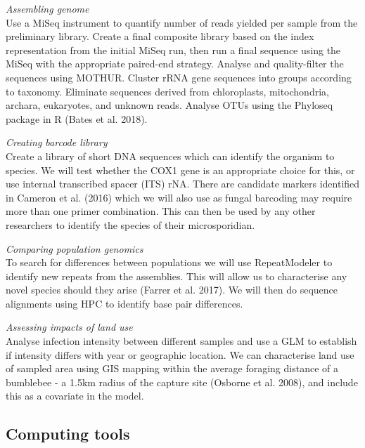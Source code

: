 \documentclass[11pt]{article}
\begin{document}
		\item \textit{Assembling genome} \\
		
		Use a MiSeq instrument to quantify number of reads yielded per sample from the preliminary library. Create a final composite library based on the index representation from the initial MiSeq run, then run a final sequence using the MiSeq with the appropriate paired-end strategy. Analyse and quality-filter the sequences using MOTHUR. Cluster rRNA gene sequences into groups according to taxonomy. Eliminate sequences derived from chloroplasts, mitochondria, archara, eukaryotes, and unknown reads. Analyse OTUs using the Phyloseq package in R (Bates et al. 2018).
		
		\item \textit{Creating barcode library} \\
		
		Create a library of short DNA sequences which can identify the organism to species. We will test whether the COX1 gene is an appropriate choice for this, or use internal transcribed spacer (ITS) rNA. There are candidate markers identified in Cameron et al. (2016) which we will also use as fungal barcoding may require more than one primer combination.  This can then be used by any other researchers to identify the species of their microsporidian.
		
		\item \textit{Comparing population genomics} \\
		
		To search for differences between populations we will use RepeatModeler to identify new repeats from the assemblies. This will allow us to characterise any novel species should they arise (Farrer et al. 2017). We will then do sequence alignments using HPC to identify base pair differences.
		
		\item \textit{Assessing impacts of land use} \\
		
		Analyse infection intensity between different samples and use a GLM to establish if intensity differs with year or geographic location. We can characterise land use of sampled area using GIS mapping within the average foraging distance of a bumblebee - a 1.5km radius of the capture site (Osborne et al. 2008), and include this as a covariate in the model.
	
	\subsection*{Computing tools}
	
\end{document}
